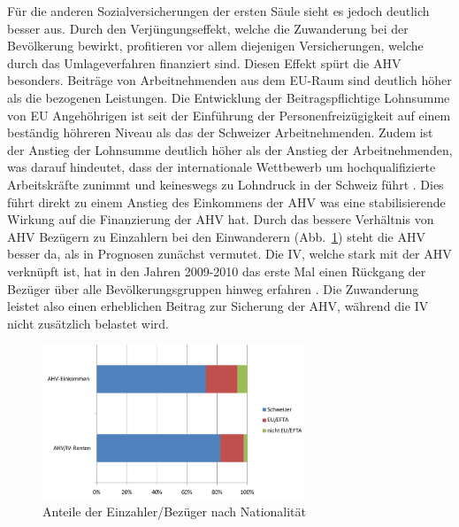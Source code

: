 
Für die anderen Sozialversicherungen der ersten Säule sieht es jedoch deutlich besser aus. Durch den Verjüngungseffekt,
welche die Zuwanderung bei der Bevölkerung bewirkt, profitieren vor allem diejenigen Versicherungen, welche durch das 
Umlageverfahren finanziert sind. Diesen Effekt spürt die AHV besonders. Beiträge von Arbeitnehmenden 
aus dem EU-Raum sind deutlich höher als die bezogenen Leistungen. Die Entwicklung der Beitragspflichtige Lohnsumme von EU
Angehöhrigen ist seit der Einführung der Personenfreizügigkeit auf einem beständig höhreren Niveau als das der Schweizer
Arbeitnehmenden. Zudem ist der Anstieg der Lohnsumme deutlich höher als der Anstieg der Arbeitnehmenden, was darauf hindeutet,
dass der internationale Wettbewerb um hochqualifizierte Arbeitskräfte zunimmt und keineswegs zu Lohndruck in der Schweiz führt \cite[S. 69-70]{ADMIN:Bericht}.
Dies führt direkt zu einem Anstieg des Einkommens der AHV was eine stabilisierende Wirkung auf die Finanzierung der AHV hat.
Durch das bessere Verhältnis von AHV Bezügern zu Einzahlern bei den Einwanderern (Abb.~\ref{fig:ahvanteil}) steht die AHV besser da, als in Prognosen 
zunächst vermutet.
Die IV, welche stark mit der AHV verknüpft ist, hat in den Jahren 2009-2010 das erste Mal einen Rückgang der
Bezüger über alle Bevölkerungsgruppen hinweg erfahren \cite[S. 73]{ADMIN:Bericht}. Die Zuwanderung leistet also einen 
erheblichen Beitrag zur Sicherung der AHV, während die IV nicht zusätzlich belastet wird.
\newpage
\begin{figure}[ht]
	\begin{center}
		\includegraphics[width=0.7\textwidth]{images/AHV-Anteile.png}
	\end{center}
	\caption{Anteile der Einzahler/Bezüger nach Nationalität \cite[S. 72]{ADMIN:Bericht}}
	\label{fig:ahvanteil}
\end{figure}


